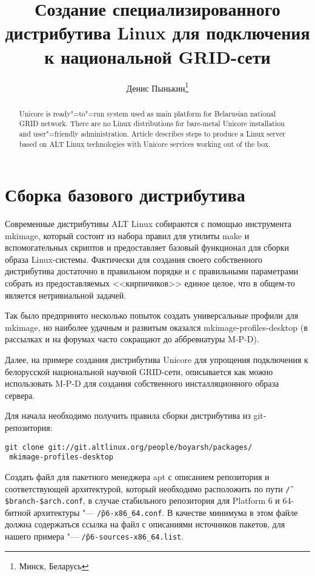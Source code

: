\documentclass[10pt, a5paper]{article}
\begin{document}
\title{Создание специализированного дистрибутива Linux для подключения к национальной GRID-сети}
\author{Денис Пынькин\footnote{Минск, Беларусь}}
\def\progref!#1!{\texttt{#1}}

\maketitle

\begin{abstract}
Unicore is ready"=to"=run system used as main platform for Be\-la\-ru\-sian national GRID network. 
There are no Linux distributions for bare-metal Unicore installation and user"=friendly admi\-ni\-stra\-tion. 
Article describes steps to produce a Linux server based on ALT Linux technologies with Unicore services working out of the box.
\end{abstract}

\section*{Сборка базового дистрибутива}
Современные дистрибутивы ALT Linux собираются с помощью инструмента mkimage,
который состоит из набора правил для утилиты make и вспомогательных скриптов 
и предоставляет базовый функционал для сборки образа Linux-системы. 
Фактически для создания своего собственного дистрибутива достаточно в 
правильном порядке и с правильными параметрами собрать из предоставляемых 
<<кирпичиков>> единое целое, что в общем-то является нетривиальной задачей.

Так было предпринято несколько попыток создать универсальные профили для mkimage,
но наиболее удачным и развитым оказался mkimage-profiles-desktop 
(в рассылках и на форумах часто сокращают до аббревиатуры M-P-D).

Далее, на примере создания дистрибутива Unicore для упрощения подключения к 
белорусской национальной научной GRID-сети, описывается как можно 
использовать M-P-D для создания собственного инсталляционного образа сервера.

Для начала необходимо получить правила сборки дистрибутива из git-репозитория:
\begin{verbatim}
git clone git://git.altlinux.org/people/boyarsh/packages/
 mkimage-profiles-desktop
\end{verbatim}

 Создать файл для пакетного менеджера apt с описанием репозитория и соответствующей 
 архитектурой, который необходимо расположить по пути {\tt \~/\$branch-\$arch.conf}, 
 в случае стабильного репозитория для Platform 6 и 64-битной архитектуры "--- \linebreak 
 {\tt \~/p6-x86\_64.conf}. В качестве минимума в этом файле должна содержаться 
 ссылка на файл с описаниями источников пакетов, для нашего примера "---
 {\tt \~/p6-sources-x86\_64.list}.
\end{document}
